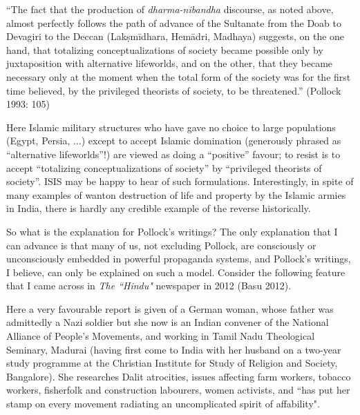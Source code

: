 \begin{myquote}
“The fact that the production of {\sl dharma-nibandha} discourse, as noted above, almost perfectly follows the path of advance of the Sultanate from the Doab to Devagiri to the Deccan (Lakṣmīdhara, Hemādri, Madhaya) suggests, on the one hand, that totalizing conceptualizations of society became possible only by juxtaposition with alternative lifeworlds, and on the other, that they became necessary only at the moment when the total form of the society was for the first time believed, by the privileged theorists of society, to be threatened.” 
\hfill(Pollock 1993: 105)
\end{myquote}

Here Islamic military structures who have gave no choice to large populations (Egypt, Persia, $\ldots$) except to accept Islamic domination (generously phrased as “alternative lifeworlds”!) are viewed as doing a “positive” favour; to resist is to accept “totalizing conceptualizations of society” by “privileged theorists of society”. ISIS may be happy to hear of such formulations. Interestingly, in spite of many examples of wanton destruction of life and property by the Islamic armies in India, there is hardly any credible example of the reverse historically. 

So what is the explanation for Pollock's writings? The only explanation that I can advance is that many of us, not excluding Pollock, are consciously or unconsciously embedded in powerful propaganda systems, and Pollock’s writings, I believe, can only be explained on such a model.  Consider the following feature that I came across in {\sl The ``Hindu"} newspaper in 2012 (Basu 2012).

Here a very favourable report is given of a German woman, whose father was admittedly a Nazi soldier but she now is an Indian convener of the National Alliance of People's Movements, and working in Tamil Nadu Theological Seminary, Madurai (having first come to India with her husband on a two-year study programme at the Christian Institute for Study of Religion and Society, Bangalore). She researches Dalit atrocities, issues affecting farm workers, tobacco workers, fisherfolk and construction labourers, women activists, and ``has put her stamp on every movement radiating an uncomplicated spirit of affability".

